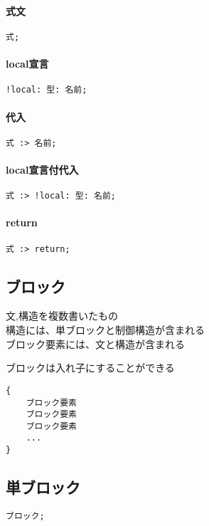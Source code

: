         \paragraph{式文}
\begin{lstlisting}[]
式;
\end{lstlisting}
        \paragraph{local宣言}
\begin{lstlisting}[]
!local: 型: 名前;
\end{lstlisting}
        \paragraph{代入}
\begin{lstlisting}[]
式 :> 名前;
\end{lstlisting}
        \paragraph{local宣言付代入}
\begin{lstlisting}[]
式 :> !local: 型: 名前;
\end{lstlisting}
        \paragraph{return}
\begin{lstlisting}[]
式 :> return;
\end{lstlisting}


\subsection{ブロック}
文,構造を複数書いたもの\\
構造には、単ブロックと制御構造が含まれる\\
ブロック要素には、文と構造が含まれる

ブロックは入れ子にすることができる

\begin{lstlisting}[]
{
    ブロック要素
    ブロック要素
    ブロック要素
    ...
}
\end{lstlisting}

\subsection{単ブロック}
\begin{lstlisting}[]
ブロック;
\end{lstlisting}


